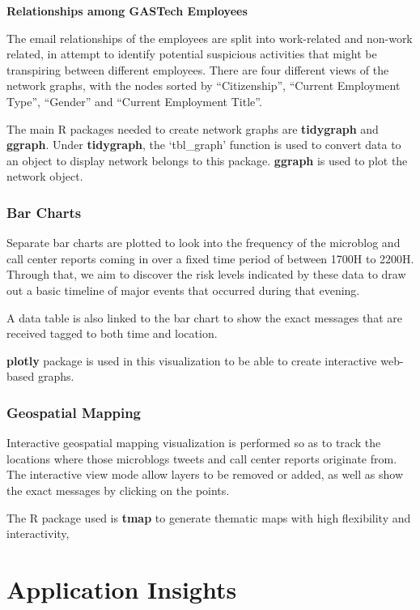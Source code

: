 \documentclass{acm_proc_article-sp}
\begin{document}
\textbf{Relationships among GASTech Employees}

The email relationships of the employees are split into work-related and
non-work related, in attempt to identify potential suspicious activities
that might be transpiring between different employees. There are four
different views of the network graphs, with the nodes sorted by
``Citizenship'', ``Current Employment Type'', ``Gender'' and ``Current
Employment Title''.

The main R packages needed to create network graphs are
\textbf{tidygraph} and \textbf{ggraph}. Under \textbf{tidygraph}, the
`tbl\_graph' function is used to convert data to an object to display
network belongs to this package. \textbf{ggraph} is used to plot the
network object.

\hypertarget{bar-charts}{%
\subsubsection{Bar Charts}\label{bar-charts}}

Separate bar charts are plotted to look into the frequency of the
microblog and call center reports coming in over a fixed time period of
between 1700H to 2200H. Through that, we aim to discover the risk levels
indicated by these data to draw out a basic timeline of major events
that occurred during that evening.

A data table is also linked to the bar chart to show the exact messages
that are received tagged to both time and location.

\textbf{plotly} package is used in this visualization to be able to
create interactive web-based graphs.

\hypertarget{geospatial-mapping}{%
\subsubsection{Geospatial Mapping}\label{geospatial-mapping}}

Interactive geospatial mapping visualization is performed so as to track
the locations where those microblogs tweets and call center reports
originate from. The interactive view mode allow layers to be removed or
added, as well as show the exact messages by clicking on the points.

The R package used is \textbf{tmap} to generate thematic maps with high
flexibility and interactivity,

\hypertarget{application-insights}{%
\section{Application Insights}\label{application-insights}}
\end{document}
